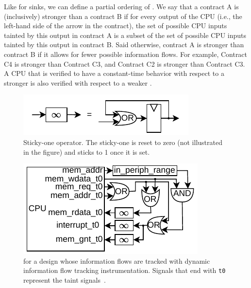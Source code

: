 
Like for sinks, we can define a partial ordering of \pics.
We say that a contract A is (inclusively) stronger than a contract B if for every output of the CPU (i.e., the left-hand side of the arrow in the contract), the set of possible CPU inputs tainted by this output in contract A is a subset of the set of possible CPU inputs tainted by this output in contract B.
Said otherwise, contract A is stronger than contract B if it allows for fewer possible information flows.
For example, Contract C4 is stronger than Contract C3, and Contract C2 is stronger than Contract C3.
A CPU that is verified to have a constant-time behavior with respect to a stronger \pic is also verified with respect to a weaker \pic.

\begin{figure}
    \begin{center}
    \includegraphics[width=.7\columnwidth]{figures/stickyone/stickyone.pdf}
    \end{center}
    \vspace*{-1em}
    \caption{Sticky-one operator. The sticky-one is reset to zero (not illustrated in the figure) and sticks to 1 once it is set.}
    \label{fig:stickyone}
    \vspace*{-.4em}
\end{figure}


\begin{figure}[t]
    \begin{center}
    \includegraphics[width=.7\columnwidth]{figures/picinstrum_taints/picinstrum_taints.pdf}
    \end{center}
    \vspace*{-1em}
    \caption{\Pici for a design whose information flows are tracked with dynamic information flow tracking instrumentation. Signals that end with \texttt{t0} represent the taint signals~\cite{tiwari2009complete,solt2022cellift}.
    }
    \label{fig:pic_instrum_taints}
    \vspace*{-.4em}
\end{figure}

